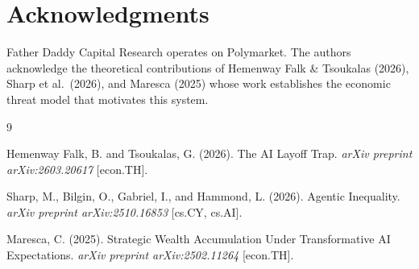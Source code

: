 \documentclass[11pt,a4paper]{article}
\begin{document}
\section*{Acknowledgments}

Father Daddy Capital Research operates on Polymarket. The authors acknowledge the theoretical contributions of Hemenway Falk \& Tsoukalas (2026), Sharp et al.\ (2026), and Maresca (2025) whose work establishes the economic threat model that motivates this system.


\begin{thebibliography}{9}

Hemenway Falk, B. and Tsoukalas, G. (2026).
\newblock The AI Layoff Trap.
\newblock \textit{arXiv preprint arXiv:2603.20617} [econ.TH].

Sharp, M., Bilgin, O., Gabriel, I., and Hammond, L. (2026).
\newblock Agentic Inequality.
\newblock \textit{arXiv preprint arXiv:2510.16853} [cs.CY, cs.AI].

Maresca, C. (2025).
\newblock Strategic Wealth Accumulation Under Transformative AI Expectations.
\newblock \textit{arXiv preprint arXiv:2502.11264} [econ.TH].

\end{thebibliography}
\end{document}

